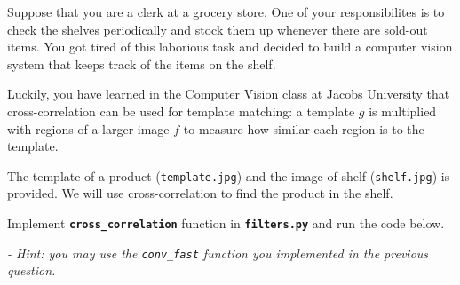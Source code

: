 \documentclass[11pt]{article}
\begin{document}
Suppose that you are a clerk at a grocery store. One of your
responsibilites is to check the shelves periodically and stock them up
whenever there are sold-out items. You got tired of this laborious task
and decided to build a computer vision system that keeps track of the
items on the shelf.

Luckily, you have learned in the Computer Vision class at Jacobs
University that cross-correlation can be used for template matching: a
template \(g\) is multiplied with regions of a larger image \(f\) to
measure how similar each region is to the template.

The template of a product (\texttt{template.jpg}) and the image of shelf
(\texttt{shelf.jpg}) is provided. We will use cross-correlation to find
the product in the shelf.

Implement \textbf{\texttt{cross\_correlation}} function in
\textbf{\texttt{filters.py}} and run the code below.

\emph{- Hint: you may use the \texttt{conv\_fast} function you
implemented in the previous question.}
\end{document}
